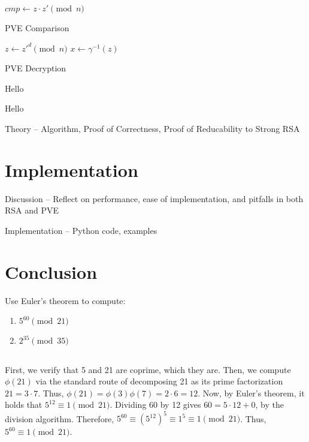 \documentclass{article}
\begin{document}
\begin{algorithm}[H]
\SetAlgoLined
{}
    $cmp \leftarrow z \cdot z' \pmod{n}$\;
 \caption{PVE Comparison}
\end{algorithm}

\begin{algorithm}[H]
\SetAlgoLined
{}
    $z \leftarrow z'^d \pmod{n}$\;
    $x \leftarrow \gamma^{-1}(z)$\;
 \caption{PVE Decryption}
\end{algorithm}


Hello

Hello

Theory – Algorithm, Proof of Correctness, Proof of Reducability to Strong RSA

\section{Implementation}

Discussion – Reflect on performance, ease of implementation, and pitfalls in both RSA and PVE

Implementation – Python code, examples

\section{Conclusion}

\newpage

Use Euler's theorem to compute:

\begin{enumerate}
    \item $5^{60} \pmod{21}$
    \item $2^{35} \pmod{35}$
\end{enumerate}

\subsection{}

First, we verify that 5 and 21 are coprime, which they are. Then, we compute $\phi(21)$ via the standard route of decomposing 21 as its prime factorization $21 = 3\cdot 7$. Thus, $\phi(21) = \phi(3)\phi(7) = 2 \cdot 6 = 12$. Now, by Euler's theorem, it holds that $5^{12} \equiv 1 \pmod{21}$. Dividing 60 by 12 gives $60 = 5 \cdot 12 + 0$, by the division algorithm. Therefore, $5^{60} \equiv (5^{12})^5 \equiv 1^5 \equiv 1 \pmod{21}$. Thus, $5^{60} \equiv 1 \pmod{21}$.
\end{document}
